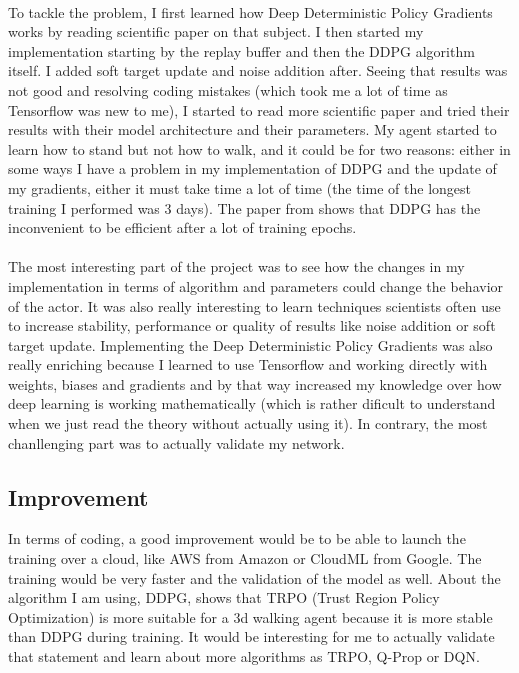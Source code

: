 \documentclass{article}
\begin{document}
\paragraph{}
To tackle the problem, I first learned how Deep Deterministic Policy Gradients works by reading
scientific paper on that subject. I then started my implementation starting by the replay buffer
and then the DDPG algorithm itself. I added soft target update and noise addition after. Seeing
that results was not good and resolving coding mistakes (which took me a lot of time as Tensorflow
was new to me), I started to read more scientific paper and tried their results with their model
architecture and their parameters. My agent started to learn how to
stand but not how to walk, and it could be for two reasons: either in some ways
I have a problem in my implementation of DDPG and the update of my gradients,
either it must take time a lot of time (the time of the longest training I
performed was 3 days). The paper from
\citeauthor{journals/corr/LillicrapHPHETS15} shows that DDPG has the
inconvenient to be efficient after a lot of training epochs. 


\paragraph{}
The most interesting part of the project was to see how the changes in my implementation in terms
of algorithm and parameters could change the behavior of the actor. It was also really interesting
to learn techniques scientists often use to increase stability, performance or quality of results
like noise addition or soft target update. Implementing the Deep Deterministic Policy Gradients
was also really enriching because I learned to use Tensorflow and working directly with weights,
biases and gradients and by that way increased my knowledge over how deep learning is working
mathematically (which is rather dificult to understand when we just read the theory without
actually using it). In contrary, the most chanllenging part was to actually validate my network. 

\subsection{Improvement}

In terms of coding, a good improvement would be to be able to launch the training over a cloud,
like AWS from Amazon or CloudML from Google. The training would be very faster and the validation
of the model as well. About the algorithm I am using, DDPG, \citeauthor{GuLilGhaTurLev17} shows
that TRPO (Trust Region Policy Optimization) is more suitable for a 3d walking
agent because it is more stable than DDPG during training. It would be
interesting for me to actually validate that statement and learn about more
algorithms as TRPO, Q-Prop or DQN.



\end{document}

